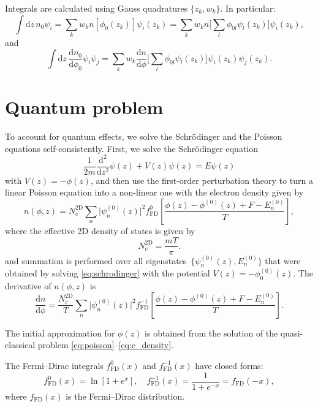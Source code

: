 \documentclass[10pt]{article}
\newcommand{\dd}{\mathrm{d}}
\newcommand{\fFD}{f_{\mathrm{FD}}}
\begin{document}
Integrals are calculated using Gauss quadratures $\{z_k, w_k\}$. In particular:
\begin{equation}
	\int \dd z \, n_0 \psi_i = \sum_k w_k n[\phi_0(z_k)] \psi_i(z_k)
	= \sum_k w_k n\Big[ \sum_l \phi_{0l} \psi_l(z_k) \Big] \psi_i(z_k),
\end{equation}
and
\begin{equation}
	\int \dd z \, \frac{\dd n_0}{\dd \phi_0} \psi_i \psi_j
	= \sum_k w_k \frac{\dd n}{\dd \phi}
		\Big[ \sum_l \phi_{0l} \psi_l(z_k) \Big] \psi_i(z_k) \psi_j(z_k).
\end{equation}

\section{Quantum problem}

To account for quantum effects, we solve the Schr\"odinger and the Poisson
equations self-consistently. First, we solve the Schr\"odinger equation
\begin{equation}
	\label{eq:schrodinger}
	\frac{1}{2m} \frac{\dd^2}{\dd z^2} \psi(z) + V(z) \psi(z) = E \psi(z)
\end{equation}
with $V(z) = -\phi(z)$, and then use the first-order perturbation theory to turn a
linear Poisson equation into a non-linear one with the electron density given by
\begin{equation}
	n(\phi, z) = N_c^\mathrm{2D} \sum_n \lvert\psi_n^{(0)}(z)\rvert^2 \fFD^0
				 \left[ \frac{\phi(z) - \phi^{(0)}(z) + F - E_n^{(0)}}{T} \right],
\end{equation}
where the effective 2D density of states is given by
\begin{equation}
	N_c^\mathrm{2D} = \frac{m T}{\pi}.
\end{equation}
and summation is performed over all eigenstates~$\{ \psi_n^{(0)}(z), E_n^{(0)} \}$
that were obtained by solving \eqref{eq:schrodinger} with the potential
$V(z) = -\phi_0^{(0)}(z)$. The derivative of $n(\phi, z)$ is
\begin{equation}
	\frac{\dd n}{\dd \phi} =
		\frac{N_c^\mathrm{2D}}{T} \sum_n \lvert\psi_n^{(0)}(z)\rvert^2 \fFD^{-1}
		\left[ \frac{\phi(z) - \phi^{(0)}(z) + F - E_n^{(0)}}{T} \right].
\end{equation}

The initial approximation for $\phi(z)$ is obtained from the solution of the
quasi-classical problem \eqref{eq:poisson}--\eqref{eq:c_density}.

The Fermi--Dirac integrals $\fFD^0(x)$ and $\fFD^{-1}(x)$ have closed forms:
\begin{equation}
	\fFD^0(x) = \ln[ 1 + e^x ], \quad
	\fFD^{-1}(x) = \frac{1}{1 + e^{-x}} = f_{\mathrm{FD}}(-x),
\end{equation}
where $f_{\mathrm{FD}}(x)$ is the Fermi--Dirac distribution.
\end{document}
